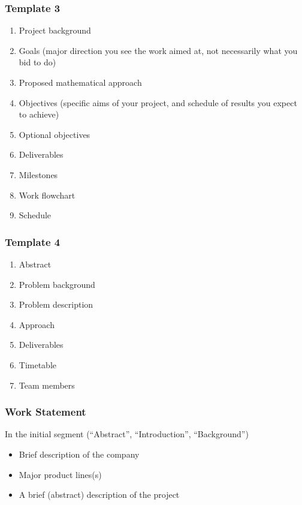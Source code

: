 \begin{frame}
    \frametitle{Template 3}
    \begin{enumerate}
        \item Project background
        \item Goals (major direction you see the work aimed at, not
            necessarily what you bid to do)
        \item Proposed mathematical approach
        \item Objectives (specific aims of your project, and schedule of
            results you expect to achieve)
        \item Optional objectives 
        \item Deliverables
        \item Milestones
        \item Work flowchart
        \item Schedule
    \end{enumerate}
\end{frame}

\begin{frame}
    \frametitle{Template 4}
    \begin{enumerate}
        \item Abstract
        \item Problem background
        \item Problem description
        \item Approach 
        \item Deliverables
        \item Timetable
        \item Team members
    \end{enumerate}
\end{frame}

\begin{frame}
    \frametitle{Work Statement}
    \begin{block}
        {In the initial segment (``Abstract'', ``Introduction'', ``Background'')}
        \begin{itemize}
            \item Brief description of the company
            \item Major product lines(s)
            \item A brief (abstract) description of the project
        \end{itemize}
    \end{block}
\end{frame}

